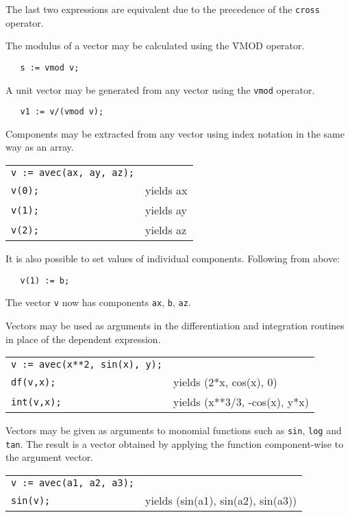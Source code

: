 The last two expressions are equivalent due to the precedence of
the \texttt{cross} operator.

\hypertarget{operator:VMOD}{}
The modulus of a vector may be calculated using the \f{VMOD} operator.
\begin{verbatim}
   s := vmod v;
\end{verbatim}
A unit vector may be generated from any vector using the \texttt{vmod}
operator.
\begin{verbatim}
   v1 := v/(vmod v);
\end{verbatim}
Components may be extracted from any vector using index notation
in the same way as an array.

\begin{tabular}{l l}
\texttt{v := avec(ax, ay, az);} & \\
\texttt{v(0);} & yields ax \\
\texttt{v(1);} & yields ay \\
\texttt{v(2);} & yields az\\
\end{tabular}

It is also possible to set values of individual components. Following
from above:
\begin{verbatim}
   v(1) := b;
\end{verbatim}
The vector \texttt{v} now has components \texttt{ax}, \texttt{b}, \texttt{az}.

 
 
Vectors may be used as arguments in the differentiation and
integration routines in place of the dependent expression.

\begin{tabular}{l l}
\texttt{v := avec(x**2, sin(x), y);} & \\
\texttt{df(v,x);} & yields (2*x, cos(x), 0) \\
\texttt{int(v,x);} & yields (x**3/3, -cos(x), y*x) \\
\end{tabular}

Vectors may be given as arguments to monomial functions such as \texttt{sin},
\texttt{log} and \texttt{tan}. The result is a vector obtained by
applying the function component-wise to the argument vector.

\begin{tabular}{l l}
\texttt{v := avec(a1, a2, a3);} & \\
\texttt{sin(v);} & yields (sin(a1), sin(a2), sin(a3)) \\
\end{tabular}

